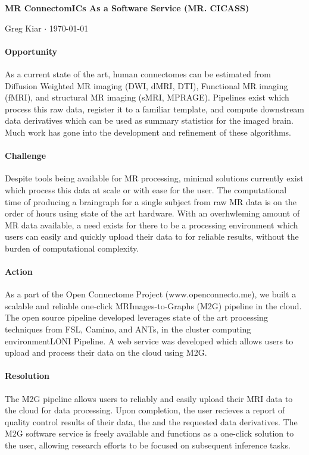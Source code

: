 \documentclass[12pt]{article}
\begin{document}
\begin{center}\Large \bf MR ConnectomICs As a Software Service (MR. CICASS) \end{center}
\begin{center} Greg Kiar $\cdot$  \today \end{center}
\bigskip

\paragraph{Opportunity}
As a current state of the art, human connectomes can be estimated from Diffusion Weighted MR imaging (DWI, dMRI, DTI), Functional MR imaging (fMRI), and structural MR imaging (sMRI, MPRAGE). Pipelines exist which process this raw data, register it to a familiar template, and compute downstream data derivatives which can be used as summary statistics for the imaged brain. Much work has gone into the development and refinement of these algorithms.
\paragraph{Challenge}
Despite tools being available for MR processing, minimal solutions currently exist which process this data at scale or with ease for the user. The computational time of producing a braingraph for a single subject from raw MR data is on the order of hours using state of the art hardware. With an overhwleming amount of MR data available, a need exists for there to be a processing environment which users can easily and quickly upload their data to for reliable results, without the burden of computational complexity.
\paragraph{Action}
As a part of the Open Connectome Project (www.openconnecto.me), we built a scalable and reliable one-click MRImages-to-Graphs (M2G) pipeline in the cloud. The open source pipeline developed leverages state of the art processing techniques from FSL, Camino, and ANTs, in the cluster computing environmentLONI Pipeline. A web service was developed which allows users to upload and process their data on the cloud using M2G.
\paragraph{Resolution}
The M2G pipeline allows users to reliably and easily upload their MRI data to the cloud for data processing. Upon completion, the user recieves a report of quality control results of their data, the and the requested data derivatives. The M2G software service is freely available and functions as a one-click solution to the user, allowing research efforts to be focused on subsequent inference tasks.
\end{document}
